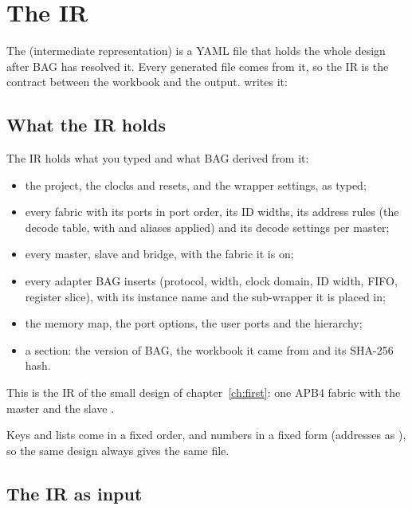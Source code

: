 \chapter{The IR}
\label{ch:ir}

The  (intermediate representation) is a YAML file that holds the whole design
after BAG has resolved it. Every generated file comes from it, so the IR is the contract
between the workbook and the output.  writes it:

\begin{center}
\end{center}

\section{What the IR holds}

The IR holds what you typed and what BAG derived from it:

\begin{itemize}
\item the project, the clocks and resets, and the wrapper settings, as typed;
\item every fabric with its ports in port order, its ID widths, its address rules (the
  decode table, with  and aliases applied) and its decode settings per
  master;
\item every master, slave and bridge, with the fabric it is on;
\item every adapter BAG inserts (protocol, width, clock domain, ID width, FIFO, register
  slice), with its instance name and the sub-wrapper it is placed in;
\item the memory map, the port options, the user ports and the hierarchy;
\item a  section: the version of BAG, the workbook it came from and its
  SHA-256 hash.
\end{itemize}

This is the IR of the small design of chapter~\ref{ch:first}: one APB4 fabric
 with the master  and the slave .



Keys and lists come in a fixed order, and numbers in a fixed form (addresses as
), so the same design always gives the same file.

\section{The IR as input}

